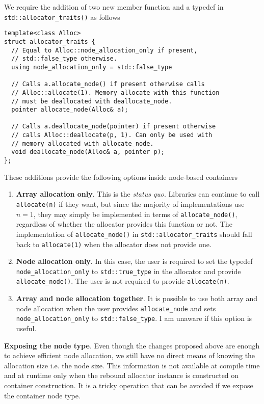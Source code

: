 \documentclass[11pt]{article}
\begin{document}
We require the addition of two new member function and
a typedef in \texttt{std::allocator\_traits()} as follows

\medskip
\begin{lstlisting}
template<class Alloc>
struct allocator_traits {
  // Equal to Alloc::node_allocation_only if present,
  // std::false_type otherwise.
  using node_allocation_only = std::false_type

  // Calls a.allocate_node() if present otherwise calls
  // Alloc::allocate(1). Memory allocate with this function
  // must be deallocated with deallocate_node.
  pointer allocate_node(Alloc& a);

  // Calls a.deallocate_node(pointer) if present otherwise
  // calls Alloc::deallocate(p, 1). Can only be used with
  // memory allocated with allocate_node.
  void deallocate_node(Alloc& a, pointer p);
};
\end{lstlisting}
These additions provide the following options inside node-based
containers
\begin{enumerate}
\item {\bf Array allocation only}.
This is the {\it status quo}. Libraries can continue to call
\texttt{allocate(n)} if they want, but since the majority of implementations
use $n = 1$, they may simply be implemented in terms of
\texttt{allocate\_node()}, regardless of whether the allocator provides this
function or not. The implementation of \texttt{allocate\_node()} in
\texttt{std::allocator\_traits} should fall back to \texttt{allocate(1)} 
when the allocator does not provide one.

\item {\bf Node allocation only}.
In this case, the user is required to set the typedef \texttt{node\_allocation\_only}
to \texttt{std::true\_type} in the allocator and provide \texttt{allocate\_node()}. The user is
not required to provide \texttt{allocate(n)}.
\item {\bf Array and node allocation together}. It is possible to use
both array {and} node allocation when the user provides \texttt{allocate\_node}
and sets \texttt{node\_allocation\_only} to \texttt{std::false\_type}.
I am unaware if this option is useful.
\end{enumerate}

\medskip
\noindent
{\bf Exposing the node type}. Even though the changes proposed above are enough
to achieve efficient node allocation, we still have no direct means of knowing
the allocation size i.e. the node size. This information is not available at
compile time and at runtime only when the rebound allocator instance is
constructed on container construction. It is a tricky operation that can be
avoided if we expose the container node type.
\end{document}
